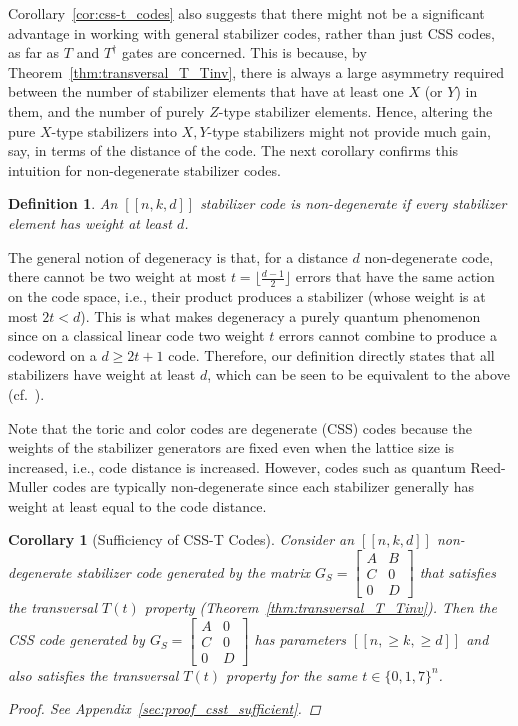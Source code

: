 \documentclass[twoside,romanappendices]{IEEEtran}
\newtheorem{corollary}[theorem]{Corollary}
\newtheorem{definition}[theorem]{Definition}
\newcommand{\llbr}{[\![}
\newcommand{\rrbr}{]\!]}
\begin{document}
Corollary~\ref{cor:css-t_codes} also suggests that there might not be a significant advantage in working with general stabilizer codes, rather than just CSS codes, as far as $T$ and $T^{\dagger}$ gates are concerned.
This is because, by Theorem~\ref{thm:transversal_T_Tinv}, there is always a large asymmetry required between the number of stabilizer elements that have at least one $X$ (or $Y$) in them, and the number of purely $Z$-type stabilizer elements. 
Hence, altering the pure $X$-type stabilizers into $X,Y$-type stabilizers might not provide much gain, say, in terms of the distance of the code.
The next corollary confirms this intuition for non-degenerate stabilizer codes.


\begin{definition}
An $\llbr n,k,d \rrbr$ stabilizer code is non-degenerate if every stabilizer element has weight at least $d$.
\end{definition}

The general notion of degeneracy is that, for a distance $d$ non-degenerate code, there cannot be two weight at most $t = \lfloor \frac{d-1}{2} \rfloor$ errors that have the same action on the code space, i.e., their product produces a stabilizer (whose weight is at most $2t < d$).
This is what makes degeneracy a purely quantum phenomenon since on a classical linear code two weight $t$ errors cannot combine to produce a codeword on a $d \geq 2t + 1$ code.
Therefore, our definition directly states that all stabilizers have weight at least $d$, which can be seen to be equivalent to the above (cf.~\cite{Gottesman-arxiv98}).

Note that the toric and color codes are degenerate (CSS) codes because the weights of the stabilizer generators are fixed even when the lattice size is increased, i.e., code distance is increased.
However, codes such as quantum Reed-Muller codes are typically non-degenerate since each stabilizer generally has weight at least equal to the code distance.



\begin{corollary}[Sufficiency of CSS-T Codes]
\label{cor:csst_sufficient}
Consider an $\llbr n, k, d \rrbr$ non-degenerate stabilizer code generated by the matrix 
$G_S = 
\begin{bmatrix}
 A & B \\ 
 C & 0 \\
 0 & D 
\end{bmatrix}$
that satisfies the transversal $T(t)$ property (Theorem~\ref{thm:transversal_T_Tinv}). 
Then the CSS code generated by 
$G_S = 
\begin{bmatrix}
 A & 0 \\ 
 C & 0 \\
 0 & D 
\end{bmatrix}$
has parameters $\llbr n, \geq k, \geq d \rrbr$ and also satisfies the transversal $T(t)$ property for the same $t \in \{0,1,7\}^n$.
\begin{proof}
See Appendix~\ref{sec:proof_csst_sufficient}.
\end{proof}
\end{corollary}
\end{document}
